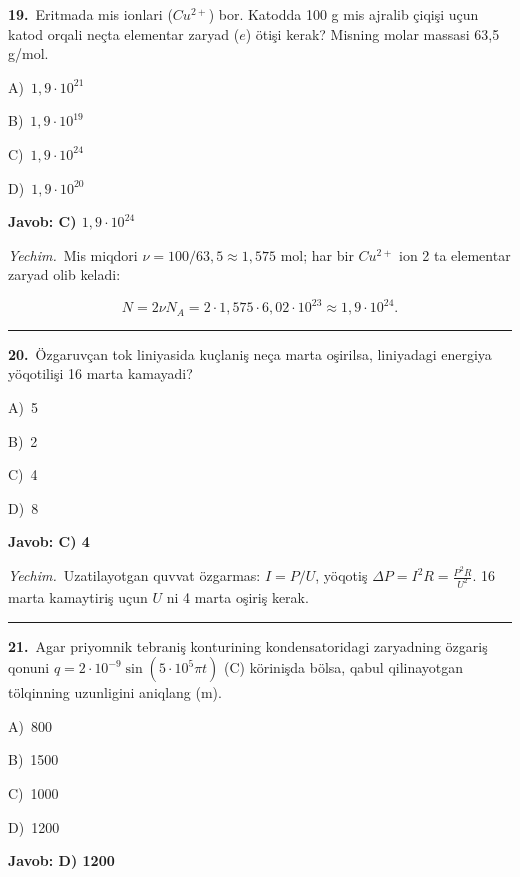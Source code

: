 \documentclass[11pt,a4paper]{article}
\newcommand{\opt}[2]{\hspace*{4mm}#1)\ #2\par}
\begin{document}
\noindent\begin{minipage}{\linewidth}
\textbf{19.}\ Eritmada mis ionlari ($Cu^{2+}$) bor. Katodda 100 g mis ajralib çiqişi uçun katod orqali neçta elementar zaryad ($e$) ötişi kerak? Misning molar massasi 63,5 g/mol.\par\smallskip
\opt{A}{$1{,}9\cdot10^{21}$}
\opt{B}{$1{,}9\cdot10^{19}$}
\opt{C}{$1{,}9\cdot10^{24}$}
\opt{D}{$1{,}9\cdot10^{20}$}
\end{minipage}\vspace{2pt}\par
\noindent\colorbox{gray!12}{\parbox{\dimexpr\linewidth-2\fboxsep}{\textbf{Javob: C) $1{,}9\cdot10^{24}$}}}\par\smallskip
\noindent\textit{Yechim.}\ Mis miqdori $\nu=100/63{,}5\approx1{,}575$ mol; har bir $Cu^{2+}$ ion 2 ta elementar zaryad olib keladi:\par
\[N=2\nu N_A=2\cdot1{,}575\cdot6{,}02\cdot10^{23}\approx1{,}9\cdot10^{24}.\]\par\medskip\hrule\medskip
{}\noindent\begin{minipage}{\linewidth}
\textbf{20.}\ Özgaruvçan tok liniyasida kuçlaniş neça marta oşirilsa, liniyadagi energiya yöqotilişi 16 marta kamayadi?\par\smallskip
\opt{A}{5}
\opt{B}{2}
\opt{C}{4}
\opt{D}{8}
\end{minipage}\vspace{2pt}\par
\noindent\colorbox{gray!12}{\parbox{\dimexpr\linewidth-2\fboxsep}{\textbf{Javob: C) 4}}}\par\smallskip
\noindent\textit{Yechim.}\ Uzatilayotgan quvvat özgarmas: $I=P/U$, yöqotiş $\Delta P=I^2R=\frac{P^2R}{U^2}$. 16 marta kamaytiriş uçun $U$ ni 4 marta oşiriş kerak.\par\par\medskip\hrule\medskip
{}\noindent\begin{minipage}{\linewidth}
\textbf{21.}\ Agar priyomnik tebraniş konturining kondensatoridagi zaryadning özgariş qonuni $q=2\cdot10^{-9}\sin(5\cdot10^5\pi t)$ (C) körinişda bölsa, qabul qilinayotgan tölqinning uzunligini aniqlang (m).\par\smallskip
\opt{A}{800}
\opt{B}{1500}
\opt{C}{1000}
\opt{D}{1200}
\end{minipage}\vspace{2pt}\par
\noindent\colorbox{gray!12}{\parbox{\dimexpr\linewidth-2\fboxsep}{\textbf{Javob: D) 1200}}}\par\smallskip
\end{document}
